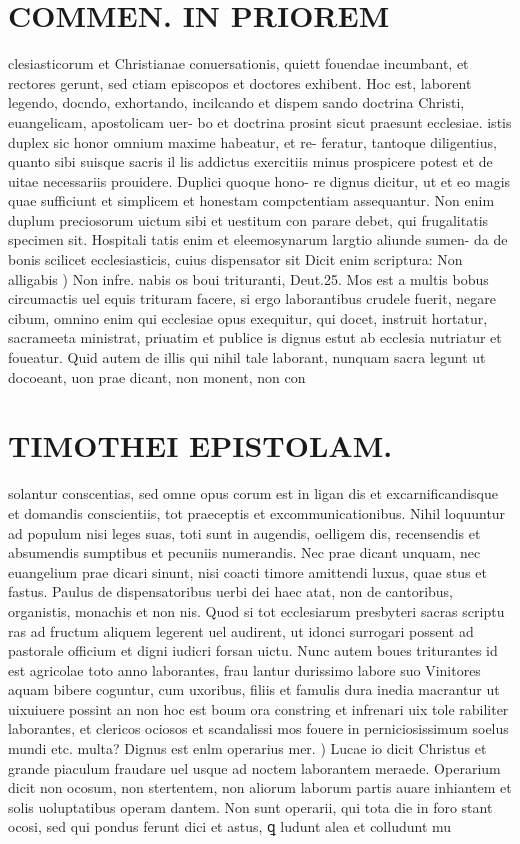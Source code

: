 \documentclass{article}
\begin{document}
\begin{pages}
\section*{COMMEN. IN PRIOREM }
\marginpar{[ p.138 ]}\pstart clesiasticorum et Christianae conuersationis, quiett fouendae incumbant, et rectores gerunt, sed ctiam episcopos et doctores exhibent. Hoc est, laborent legendo, docndo, exhortando, incilcando et dispem sando doctrina Christi, euangelicam, apostolicam uer- bo et doctrina prosint sicut praesunt ecclesiae. istis duplex sic honor omnium maxime habeatur, et re- feratur, tantoque diligentius, quanto sibi suisque sacris il lis addictus exercitiis minus prospicere potest et de uitae necessariis prouidere. Duplici quoque hono- re dignus dicitur, ut et eo magis quae sufficiunt et simplicem et honestam compctentiam assequantur. Non enim duplum preciosorum uictum sibi et uestitum con parare debet, qui frugalitatis specimen sit. Hospitali tatis enim et eleemosynarum largtio aliunde sumen- da de bonis scilicet ecclesiasticis, cuius dispensator sit  \pend\pstart Dicit enim scriptura: Non alligabis ) Non infre. nabis os boui trituranti, Deut.25. Mos est a multis bobus circumactis uel equis trituram facere, si ergo laborantibus crudele fuerit, negare cibum, omnino enim qui ecclesiae opus exequitur, qui docet, instruit hortatur, sacrameeta ministrat, priuatim et publice is dignus estut ab ecclesia nutriatur et foueatur. Quid autem de illis qui nihil tale laborant, nunquam sacra legunt ut docoeant, uon prae dicant, non monent, non con  \pend
\section*{TIMOTHEI EPISTOLAM. }
\marginpar{[ p.139 ]}\pstart solantur conscentias, sed omne opus corum est in ligan dis et excarnificandisque et domandis conscientiis, tot praeceptis et excommunicationibus. Nihil loquuntur ad populum nisi leges suas, toti sunt in augendis, oelligem dis, recensendis et absumendis sumptibus et pecuniis numerandis. Nec prae dicant unquam, nec euangelium prae dicari sinunt, nisi coacti timore amittendi luxus, quae stus et fastus. Paulus de dispensatoribus uerbi dei haec atat, non de cantoribus, organistis, monachis et non nis. Quod si tot ecclesiarum presbyteri sacras scriptu ras ad fructum aliquem legerent uel audirent, ut idonci surrogari possent ad pastorale officium et digni iudicri forsan uictu. Nunc autem boues triturantes id est agricolae toto anno laborantes, frau lantur durissimo labore suo Vinitores aquam bibere coguntur, cum uxoribus, filiis et famulis dura inedia macrantur ut uixuiuere possint an non hoc est boum ora constring et infrenari uix tole rabiliter laborantes, et clericos ociosos et scandalissi mos fouere in perniciosissimum soelus mundi etc. multa?  \pend\pstart Dignus est enlm operarius mer. ) Lucae io dicit Christus et grande piaculum fraudare uel usque ad noctem laborantem meraede. Operarium dicit non ocosum, non stertentem, non aliorum laborum partis auare inhiantem et solis uoluptatibus operam dantem. Non sunt operarii, qui tota die in foro stant ocosi, sed qui pondus ferunt dici et astus, ꝗ ludunt alea et colludunt mu  \pend

\end{pages}
\end{document}
